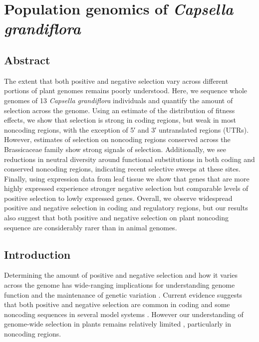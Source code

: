 \setlength{\parindent}{0ex}
\setlength{\parskip}{2ex}

\chapter{Population genomics of \textit{Capsella grandiflora}}

\section{Abstract}
The extent that both positive and negative selection vary across different portions of plant genomes remains poorly understood. Here, we sequence whole genomes of 13 \textit{Capsella grandiflora} individuals and quantify the amount of selection across the genome. Using an estimate of the distribution of fitness effects, we show that selection is strong in coding regions, but weak in most noncoding regions, with the exception of 5′ and 3′ untranslated regions (UTRs). However, estimates of selection on noncoding regions conserved across the Brassicaceae family show strong signals of selection. Additionally, we see reductions in neutral diversity around functional substitutions in both coding and conserved noncoding regions, indicating recent selective sweeps at these sites. Finally, using expression data from leaf tissue we show that genes that are more highly expressed experience stronger negative selection but comparable levels of positive selection to lowly expressed genes. Overall, we observe widespread positive and negative selection in coding and regulatory regions, but our results also suggest that both positive and negative selection on plant noncoding sequence are considerably rarer than in animal genomes.

\section{Introduction}
Determining the amount of positive and negative selection and how it varies across the genome has wide-ranging implications for understanding genome function and the maintenance of genetic variation \citep{keightley2010}. Current evidence suggests that both positive and negative selection are common in coding and some noncoding sequences in several model systems \citep{andolfatto2005,torgerson2009, lindblad2011, arbiza2013, hough2013, zhen2012, Halligan2013}. However our understanding of genome-wide selection in plants remains relatively limited \citep{hough2013}, particularly in noncoding regions. 

